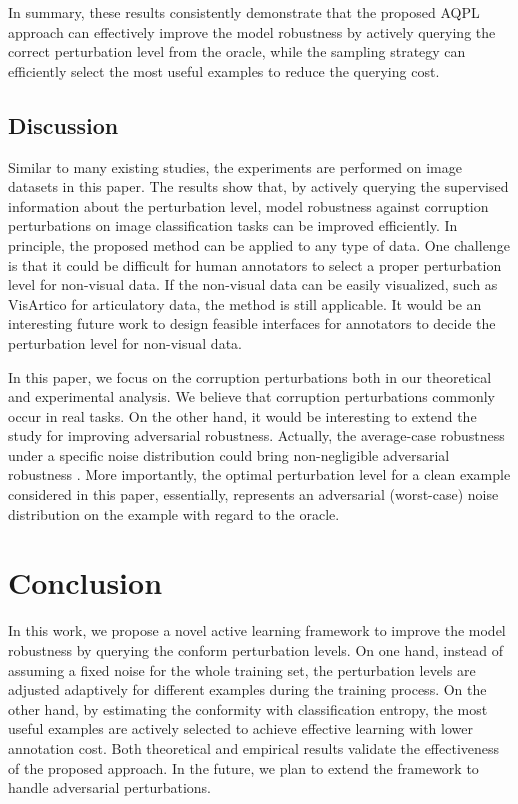 \documentclass[letterpaper]{article} %
\begin{document}
In summary, these results consistently demonstrate that the proposed AQPL approach can effectively improve the model robustness by actively querying the correct perturbation level from the oracle, while the sampling strategy can efficiently select the most useful examples to reduce the querying cost.


\subsection{Discussion}

Similar to many existing studies, the experiments are performed on image datasets in this paper. The results show that, by actively querying the supervised information about the perturbation level, model robustness against corruption perturbations on image classification tasks can be improved efficiently. In principle, the proposed method can be applied to any type of data. One challenge is that it could be difficult for human annotators to select a proper perturbation level for non-visual data. If the non-visual data can be easily visualized, such as VisArtico \cite{ouni2012visartico} for articulatory data, the method is still applicable. It would be an interesting future work to design feasible interfaces for annotators to decide the perturbation level for non-visual data.

In this paper, we focus on the corruption perturbations both in our theoretical and experimental analysis. We believe that corruption perturbations commonly occur in real tasks. On the other hand, it would be interesting to extend the study for improving adversarial robustness. Actually, the average-case robustness under a specific noise distribution could bring non-negligible adversarial robustness \cite{wong2020learning}. More importantly, the optimal perturbation level for a clean example considered in this paper, essentially, represents an adversarial (worst-case) noise distribution on the example with regard to the oracle.


\section{Conclusion}

In this work, we propose a novel active learning framework to improve the model robustness by querying the conform perturbation levels. On one hand, instead of assuming a fixed noise for the whole training set, the perturbation levels are adjusted adaptively for different examples during the training process. On the other hand, by estimating the conformity with classification entropy, the most useful examples are actively selected to achieve effective learning with lower annotation cost. Both theoretical and empirical results validate the effectiveness of the proposed approach. In the future, we plan to extend the framework to handle adversarial perturbations.
\end{document}
